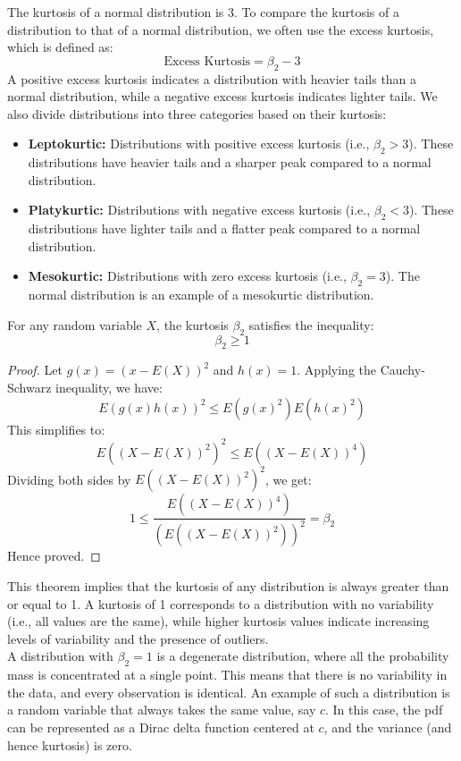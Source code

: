 \documentclass[openany]{book}
\begin{document}
\begin{mynote}
    The kurtosis of a normal distribution is 3. To compare the kurtosis of a distribution to that of a normal distribution, we often use the excess kurtosis, which is defined as:
    $$\text{Excess Kurtosis} = \beta_2 - 3$$
    A positive excess kurtosis indicates a distribution with heavier tails than a normal distribution, while a negative excess kurtosis indicates lighter tails.
    We also divide distributions into three categories based on their kurtosis:
    \begin{itemize}
        \item \textbf{Leptokurtic:} Distributions with positive excess kurtosis (i.e., $\beta_2 > 3$). These distributions have heavier tails and a sharper peak compared to a normal distribution.
        \item \textbf{Platykurtic:} Distributions with negative excess kurtosis (i.e., $\beta_2 < 3$). These distributions have lighter tails and a flatter peak compared to a normal distribution.
        \item \textbf{Mesokurtic:} Distributions with zero excess kurtosis (i.e., $\beta_2 = 3$). The normal distribution is an example of a mesokurtic distribution.
    \end{itemize}
\end{mynote}
\begin{mytheorem}
    For any random variable $X$, the kurtosis $\beta_2$ satisfies the inequality:
    $$\beta_2 \geq 1$$
\end{mytheorem}
\begin{proof}
    Let $g(x) = (x - E(X))^2$ and $h(x) = 1$. Applying the Cauchy-Schwarz inequality, we have:
    $$E(g(x)h(x))^2 \leq E(g(x)^2)E(h(x)^2)$$
    This simplifies to:
    $$E((X - E(X))^2)^2 \leq E((X - E(X))^4)$$
    Dividing both sides by $E((X - E(X))^2)^2$, we get:
    $$1 \leq \frac{E((X - E(X))^4)}{(E((X - E(X))^2))^2} = \beta_2$$
    Hence proved.
\end{proof}
\begin{mynote}
    This theorem implies that the kurtosis of any distribution is always greater than or equal to 1. A kurtosis of 1 corresponds to a distribution with no variability (i.e., all values are the same), while higher kurtosis values indicate increasing levels of variability and the presence of outliers. \\
    A distribution with $\beta_2 = 1$ is a degenerate distribution, where all the probability mass is concentrated at a single point. This means that there is no variability in the data, and every observation is identical. An example of such a distribution is a random variable that always takes the same value, say $c$. In this case, the pdf can be represented as a Dirac delta function centered at $c$, and the variance (and hence kurtosis) is zero.
\end{mynote}
\end{document}
